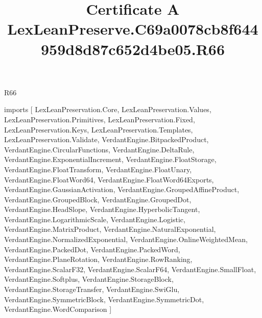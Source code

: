 \begin{lexlean}{R66}
\title{Certificate A LexLeanPreserve.C69a0078cb8f644959d8d87c652d4be05.R66}
\begin{coremodule}
imports [
  LexLeanPreservation.Core,
  LexLeanPreservation.Values,
  LexLeanPreservation.Primitives,
  LexLeanPreservation.Fixed,
  LexLeanPreservation.Keys,
  LexLeanPreservation.Templates,
  LexLeanPreservation.Validate,
  VerdantEngine.BitpackedProduct,
  VerdantEngine.CircularFunctions,
  VerdantEngine.DeltaRule,
  VerdantEngine.ExponentialIncrement,
  VerdantEngine.FloatStorage,
  VerdantEngine.FloatTransform,
  VerdantEngine.FloatUnary,
  VerdantEngine.FloatWord64,
  VerdantEngine.FloatWord64Exports,
  VerdantEngine.GaussianActivation,
  VerdantEngine.GroupedAffineProduct,
  VerdantEngine.GroupedBlock,
  VerdantEngine.GroupedDot,
  VerdantEngine.HeadSlope,
  VerdantEngine.HyperbolicTangent,
  VerdantEngine.LogarithmicScale,
  VerdantEngine.Logistic,
  VerdantEngine.MatrixProduct,
  VerdantEngine.NaturalExponential,
  VerdantEngine.NormalizedExponential,
  VerdantEngine.OnlineWeightedMean,
  VerdantEngine.PackedDot,
  VerdantEngine.PackedWord,
  VerdantEngine.PlaneRotation,
  VerdantEngine.RowRanking,
  VerdantEngine.ScalarF32,
  VerdantEngine.ScalarF64,
  VerdantEngine.SmallFloat,
  VerdantEngine.Softplus,
  VerdantEngine.StorageBlock,
  VerdantEngine.StorageTransfer,
  VerdantEngine.SwiGlu,
  VerdantEngine.SymmetricBlock,
  VerdantEngine.SymmetricDot,
  VerdantEngine.WordComparison
]


\end{coremodule}
\end{lexlean}
